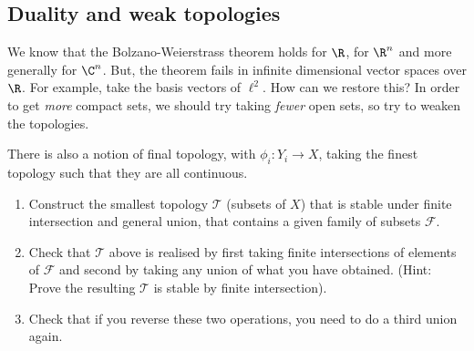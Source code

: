 \documentclass[twoside]{article}
\begin{document}
\subsection{Duality and weak topologies}
We know that the Bolzano-Weierstrass theorem holds for $\R$, for $\R^n$ and more generally for $\C^n$.
But, the theorem fails in infinite dimensional vector spaces over $\R$. For example, take the basis vectors of $\ell^2$.
How can we restore this?
In order to get \emph{more} compact sets, we should try taking \emph{fewer} open sets, so try to weaken the topologies.
\begin{remark}
    There is also a notion of \hypertarget{def:finalTop}{final topology}, with $\phi_i: Y_i \to X$, taking the finest topology such that they are all continuous.
\end{remark}
\begin{ex}\leavevmode
    \begin{enumerate}[label=(\arabic*)]
        \item Construct the smallest topology $\mathscr{T}$ (subsets of $X$) that is stable under finite intersection and general union, that contains a given family of subsets $\mathcal{F}$.
        \item Check that $\mathscr{T}$ above is realised by first taking finite intersections of elements of $\mathcal{F}$ and second by taking any union of what you have obtained. (Hint: Prove the resulting $\mathscr{T}$ is stable by finite intersection).
        \item Check that if you reverse these two operations, you need to do a third union again.
    \end{enumerate}
\end{ex}
\end{document}
